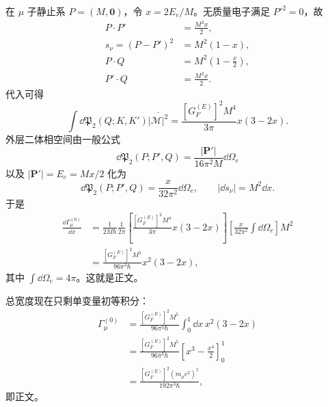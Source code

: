\begin{derivation}
在 $\mu$ 子静止系 $P=(M,\mathbf0)$，令
$x=2E_e/M$。无质量电子满足 $P'^2=0$，故
\begin{align*}
P\!\cdot P'&=\frac{M^2x}{2},\\
s_\nu=(P-P')^2&=M^2(1-x),\\
P\!\cdot Q&=M^2\left(1-\frac{x}{2}\right),\\
P'\!\cdot Q&=\frac{M^2x}{2}.
\end{align*}
代入可得
\begin{equation*}
\int\dd\mathfrak P_2(Q;K,K')\overline{|\mathcal M|^2}
=\frac{[G_F^{(E)}]^2M^4}{3\pi}x(3-2x).
\end{equation*}
外层二体相空间由一般公式
\begin{equation*}
\dd\mathfrak P_2(P;P',Q)
=\frac{|\mathbf P'|}{16\pi^2M}\dd\Omega_e
\end{equation*}
以及 $|\mathbf P'|=E_e=Mx/2$ 化为
\begin{equation*}
\dd\mathfrak P_2(P;P',Q)
=\frac{x}{32\pi^2}\dd\Omega_e,
\qquad
|\dd s_\nu|=M^2\dd x.
\end{equation*}
于是
\begin{align*}
\frac{\dd\Gamma_\mu^{(0)}}{\dd x}
&=\frac{1}{2M\hbar}\frac1{2\pi}
\left[\frac{[G_F^{(E)}]^2M^4}{3\pi}x(3-2x)\right]
\left[\frac{x}{32\pi^2}\int\dd\Omega_e\right]M^2\\
&=\frac{[G_F^{(E)}]^2M^5}{96\pi^3\hbar}
 x^2(3-2x),
\end{align*}
其中 $\int\dd\Omega_e=4\pi$。这就是正文。

总宽度现在只剩单变量初等积分：
\begin{align*}
\Gamma_\mu^{(0)}
&=\frac{[G_F^{(E)}]^2M^5}{96\pi^3\hbar}
\int_0^1\dd x\,x^2(3-2x)\\
&=\frac{[G_F^{(E)}]^2M^5}{96\pi^3\hbar}
\left[x^3-\frac{x^4}{2}\right]_0^1\\
&=\frac{[G_F^{(E)}]^2(m_\mu c^2)^5}{192\pi^3\hbar},
\end{align*}
即正文。
\end{derivation}

